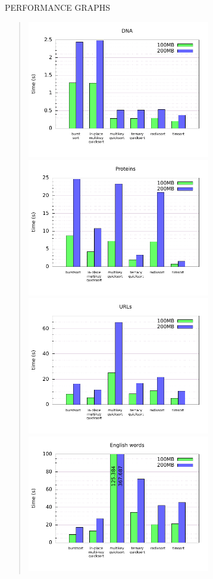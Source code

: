 {\sffamily\normalsize{\color{sciorange} PERFORMANCE GRAPHS}}\vspace{-3mm}\\
\footnotesize 
\begin{quote}
\includegraphics[width=80mm]{dna.pdf}
\includegraphics[width=80mm]{proteins.pdf}\\
\includegraphics[width=80mm]{urls.pdf}
\includegraphics[width=80mm]{english.pdf}
\end{quote}

